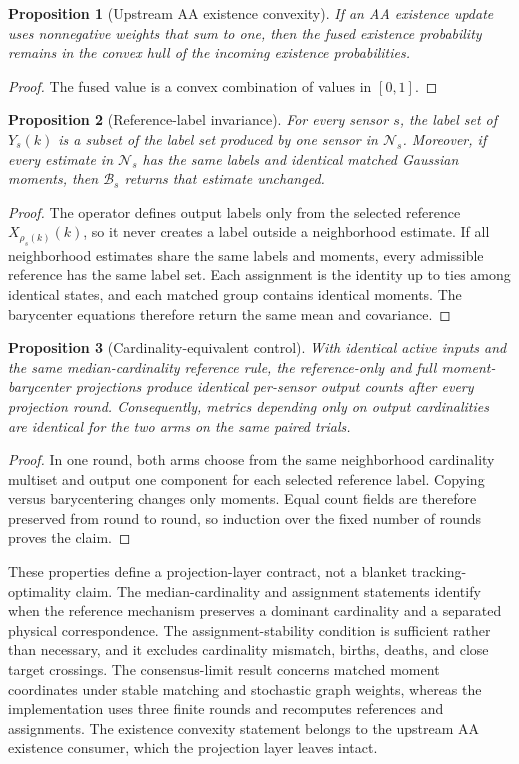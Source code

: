 \documentclass{IEEEtaes}
\newtheorem{proposition}{Proposition}
\begin{document}
\begin{proposition}[Upstream AA existence convexity]
If an AA existence update uses nonnegative weights that sum to one, then the fused existence probability remains in the convex hull of the incoming existence probabilities.
\end{proposition}
\begin{proof}
The fused value is a convex combination of values in $[0,1]$.
\end{proof}

\begin{proposition}[Reference-label invariance]
For every sensor $s$, the label set of $Y_s(k)$ is a subset of the label set produced by one sensor in $\mathcal{N}_s$. Moreover, if every estimate in $\mathcal{N}_s$ has the same labels and identical matched Gaussian moments, then $\mathcal{B}_s$ returns that estimate unchanged.
\end{proposition}
\begin{proof}
The operator defines output labels only from the selected reference $X_{\rho_s(k)}(k)$, so it never creates a label outside a neighborhood estimate. If all neighborhood estimates share the same labels and moments, every admissible reference has the same label set. Each assignment is the identity up to ties among identical states, and each matched group contains identical moments. The barycenter equations therefore return the same mean and covariance.
\end{proof}

\begin{proposition}[Cardinality-equivalent control]
With identical active inputs and the same median-cardinality reference rule, the reference-only and full moment-barycenter projections produce identical per-sensor output counts after every projection round. Consequently, metrics depending only on output cardinalities are identical for the two arms on the same paired trials.
\end{proposition}
\begin{proof}
In one round, both arms choose from the same neighborhood cardinality multiset and output one component for each selected reference label. Copying versus barycentering changes only moments. Equal count fields are therefore preserved from round to round, so induction over the fixed number of rounds proves the claim.
\end{proof}

These properties define a projection-layer contract, not a blanket tracking-optimality claim. The median-cardinality and assignment statements identify when the reference mechanism preserves a dominant cardinality and a separated physical correspondence. The assignment-stability condition is sufficient rather than necessary, and it excludes cardinality mismatch, births, deaths, and close target crossings. The consensus-limit result concerns matched moment coordinates under stable matching and stochastic graph weights, whereas the implementation uses three finite rounds and recomputes references and assignments. The existence convexity statement belongs to the upstream AA existence consumer, which the projection layer leaves intact.
\end{document}
